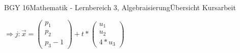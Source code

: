 \documentclass[oneside,openany,headings=optiontotoc,11pt,numbers=noenddot]{scrreprt}
\begin{document}
\begin{worksheet}{BGY 16}{Mathematik - Lernbereich 3, Algebraisierung}{Übersicht Kursarbeit}
\begin{framed}
			\(\Rightarrow j: \vec{x} = \left(\begin{array}{c}p_1\\p_2\\p_3-1\end{array}\right) + t*\left(\begin{array}{c}u_1\\u_2\\4*u_3\end{array}\right)\)\\
		\end{framed}
	\end{worksheet}
\end{document}

